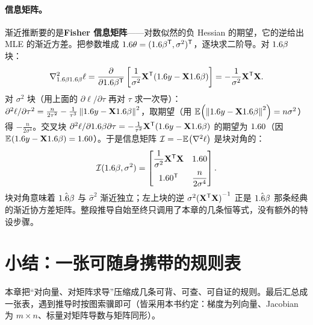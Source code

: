 \paragraph{信息矩阵。}
渐近推断要的是\textbf{Fisher 信息矩阵}——对数似然的负 Hessian 的期望，它的逆给出 MLE 的渐近方差。把参数堆成 $1.6\theta=(1.6\beta^{\mathsf{T}},\sigma^2)^{\mathsf{T}}$，逐块求二阶导。对 $1.6\beta$ 块：
\[
    \nabla^2_{1.6\beta1.6\beta}\ell=\frac{\partial }{\partial 1.6\beta^{\mathsf{T}}}\left[\frac{1}{\sigma^2}\mathbf{X}^{\mathsf{T}}(1.6 y-\mathbf{X}1.6\beta)\right]
    =-\frac{1}{\sigma^2}\mathbf{X}^{\mathsf{T}}\mathbf{X} .
\]
对 $\sigma^2$ 块（用上面的 $\partial\ell/\partial\tau$ 再对 $\tau$ 求一次导）：$\partial^2\ell/\partial\tau^2=\tfrac{n}{2\tau^2}-\tfrac{1}{\tau^3}\left\|1.6 y-\mathbf{X}1.6\beta\right\|_{}^2$，取期望（用 $\mathbb{E}_{}\!\left(\left\|1.6 y-\mathbf{X}1.6\beta\right\|_{}^2\right)=n\sigma^2$）得 $-\tfrac{n}{2\sigma^4}$。交叉块 $\partial^2\ell/\partial1.6\beta\partial\tau=-\tfrac{1}{\tau^2}\mathbf{X}^{\mathsf{T}}(1.6 y-\mathbf{X}1.6\beta)$ 的期望为 $1.6 0$（因 $\mathbb{E}_{}\!\left(1.6 y-\mathbf{X}1.6\beta\right)=1.6 0$）。于是信息矩阵 $\mathcal I=-\mathbb{E}_{}\!\left(\nabla^2\ell\right)$ 是块对角的：
\[
    \mathcal I(1.6\beta,\sigma^2)=
    \begin{bmatrix}
        \dfrac{1}{\sigma^2}\mathbf{X}^{\mathsf{T}}\mathbf{X} & 1.6 0\\[8pt]
        1.6 0^{\mathsf{T}} & \dfrac{n}{2\sigma^4}
    \end{bmatrix}.
\]
块对角意味着 $\hat{1.6\beta}$ 与 $\hat\sigma^2$ 渐近独立；左上块的逆 $\sigma^2{(\mathbf{X}^{\mathsf{T}}\mathbf{X})}^{-1}$ 正是 $\hat{1.6\beta}$ 那条经典的渐近协方差矩阵。整段推导自始至终只调用了本章的几条恒等式，没有额外的特设步骤。


\section{小结：一张可随身携带的规则表}
\label{sec:matcalc-summary}

本章把``对向量、对矩阵求导''压缩成几条可背、可查、可自证的规则。最后汇总成一张表，遇到推导时按图索骥即可（皆采用本书约定：梯度为列向量、Jacobian 为 $m\times n$、标量对矩阵导数与矩阵同形）。

